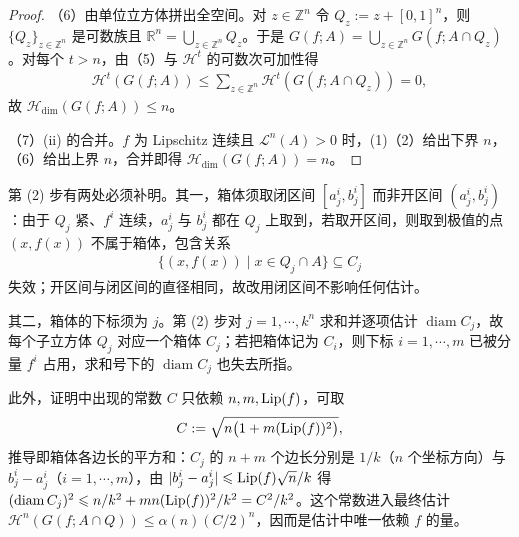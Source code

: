 \documentclass[../../main.tex]{subfiles}%
\begin{document}
\begin{proof}
（6）由单位立方体拼出全空间。对 $z\in\mathbb{Z}^n$ 令 $Q_z:=z+[0,1]^n$，则 $\{Q_z\}_{z\in\mathbb{Z}^n}$ 是可数族且 $\mathbb{R}^n=\bigcup_{z\in\mathbb{Z}^n}Q_z$。于是 $G(f;A)=\bigcup_{z\in\mathbb{Z}^n}G(f;A\cap Q_z)$。对每个 $t>n$，由（5）与 $\mathcal{H}^t$ 的可数次可加性得
\begin{align*}
\mathcal{H}^t(G(f;A))\leqslant\sum_{z\in\mathbb{Z}^n}\mathcal{H}^t(G(f;A\cap Q_z))=0 ,
\end{align*}
故 $\mathcal{H}_{\dim}(G(f;A))\leqslant n$。

（7）(ii) 的合并。$f$ 为 Lipschitz 连续且 $\mathcal{L}^n(A)>0$ 时，(1)（2）给出下界 $n$，（6）给出上界 $n$，合并即得 $\mathcal{H}_{\dim}(G(f;A))=n$。
\end{proof}

\begin{remark}\label{remark:ch02-thm-2-9-箱体与常数}
第 (2) 步有两处必须补明。其一，箱体须取闭区间 $[a_j^i,b_j^i]$ 而非开区间 $(a_j^i,b_j^i)$：由于 $Q_j$ 紧、$f^i$ 连续，$a_j^i$ 与 $b_j^i$ 都在 $Q_j$ 上取到，若取开区间，则取到极值的点 $(x,f(x))$ 不属于箱体，包含关系
\begin{align*}
\{(x,f(x))\mid x\in Q_j\cap A\}\subseteq C_j
\end{align*}
失效；开区间与闭区间的直径相同，故改用闭区间不影响任何估计。

其二，箱体的下标须为 $j$。第 (2) 步对 $j=1,\cdots,k^n$ 求和并逐项估计 $\operatorname{diam}C_j$，故每个子立方体 $Q_j$ 对应一个箱体 $C_j$；若把箱体记为 $C_i$，则下标 $i=1,\cdots,m$ 已被分量 $f^i$ 占用，求和号下的 $\operatorname{diam}C_j$ 也失去所指。

此外，证明中出现的常数 $C$ 只依赖 $n,m,\operatorname{Lip}(f)$，可取
\begin{align*}
C:=\sqrt{n\bigl(1+m(\operatorname{Lip}(f))^2\bigr)},
\end{align*}
推导即箱体各边长的平方和：$C_j$ 的 $n+m$ 个边长分别是 $1/k$（$n$ 个坐标方向）与 $b_j^i-a_j^i$（$i=1,\cdots,m$），由 $\lvert b_j^i-a_j^i\rvert\leqslant\operatorname{Lip}(f)\sqrt{n}/k$ 得 $(\operatorname{diam}C_j)^2\leqslant n/k^2+mn(\operatorname{Lip}(f))^2/k^2=C^2/k^2$。这个常数进入最终估计 $\mathcal{H}^n(G(f;A\cap Q))\leqslant\alpha(n)(C/2)^n$，因而是估计中唯一依赖 $f$ 的量。
\end{remark}
\end{document}
